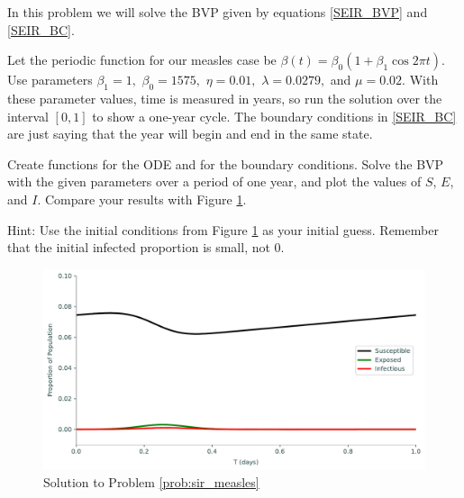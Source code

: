 \begin{problem}
In this problem we will solve the BVP given by equations \eqref{SEIR_BVP} and \eqref{SEIR_BC}.

Let the periodic function for our measles case be $\beta(t) = \beta_0(1 + \beta_1 \cos{2\pi t})$.
Use parameters $\beta_1 = 1,$ $\beta_0 = 1575,$ $\eta = 0.01,$ $\lambda = 0.0279,$ and $\mu = 0.02.$
With these parameter values, time is measured in years, so run the solution over the interval $\left[0, 1\right]$ to show a one-year cycle.
The boundary conditions in \eqref{SEIR_BC} are just saying that the year will begin and end in the same state.

Create functions for the ODE and for the boundary conditions.
Solve the BVP with the given parameters over a period of one year, and plot the values of $S$, $E$, and $I$.
Compare your results with Figure \ref{fig:sir4}.

Hint: Use the initial conditions from Figure \ref{fig:sir4} as your initial guess.
Remember that the initial infected proportion is small, not 0.

\label{prob:sir_measles}
\end{problem}

\begin{figure}[H]
    \centering
    \includegraphics[width=\textwidth]{figures/measles.pdf}
    \caption{Solution to Problem \ref{prob:sir_measles}}
    \label{fig:sir4}
\end{figure}
